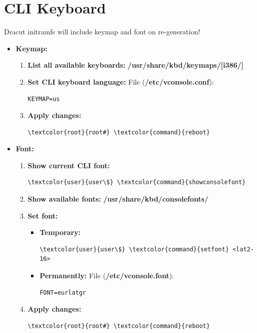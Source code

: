 \documentclass[10pt, a4paper, onecolumn, oneside, titlepage, openany]{book}
\begin{document}
\section{CLI Keyboard}
Dracut initramfs will include keymap and font on re-generation!
\begin{itemize}
    \item \textbf{Keymap:}
    \begin{enumerate}
        \item \textbf{List all available keyboards:}
\newline \textbf{\textcolor{dir}{/usr/share/kbd/keymaps/[i386/]}}
        \item \textbf{Set CLI keyboard language:}
\newline File (\textbf{\textcolor{file}{/etc/vconsole.conf}}):
\begin{Verbatim}[commandchars=\\\{\}]
KEYMAP=us
\end{Verbatim}
    \item \textbf{Apply changes:}
\begin{Verbatim}[commandchars=\\\{\}]
\textcolor{root}{root#} \textcolor{command}{reboot}
\end{Verbatim}
    \end{enumerate}
    \item \textbf{Font:}
    \begin{enumerate}
        \item \textbf{Show current CLI font:}
\begin{Verbatim}[commandchars=\\\{\}]
\textcolor{user}{user\$} \textcolor{command}{showconsolefont}
\end{Verbatim}
        \item \textbf{Show available fonts:}
\newline \textbf{\textcolor{dir}{/usr/share/kbd/consolefonts/}}
        \item \textbf{Set font:}
        \begin{itemize}
            \item \textbf{Temporary:}
\begin{Verbatim}[commandchars=\\\{\}]
\textcolor{user}{user\$} \textcolor{command}{setfont} <lat2-16>
\end{Verbatim}
            \item \textbf{Permanently:}
\newline File (\textbf{\textcolor{file}{/etc/vconsole.font}}):
\begin{Verbatim}[commandchars=\\\{\}]
FONT=eurlatgr
\end{Verbatim}
        \end{itemize}
        \item \textbf{Apply changes:}
\begin{Verbatim}[commandchars=\\\{\}]
\textcolor{root}{root#} \textcolor{command}{reboot}
\end{Verbatim}
    \end{enumerate}
\end{itemize}
\end{document}
